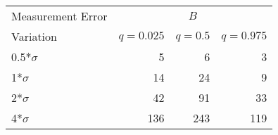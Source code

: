 
\begin{tabular}{lrrr}
\toprule
\multicolumn{1}{c}{Measurement Error} & \multicolumn{3}{c}{$B$} \\
Variation & $q = 0.025$ & $q = 0.5$ & $q = 0.975$\\
\midrule
0.5*$\sigma$ & 5 & 6 & 3\\
1*$\sigma$ & 14 & 24 & 9\\
2*$\sigma$ & 42 & 91 & 33\\
4*$\sigma$ & 136 & 243 & 119\\
\bottomrule
\end{tabular}
